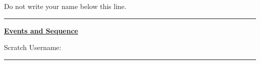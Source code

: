 \documentclass[letterpaper,12pt]{article}
\begin{document}
\noindent Do not write your name below this line. \\
\noindent \hrule
\begin{center}
{\Large \textbf{\underline{Events and Sequence}}}
\end{center}
Scratch Username: \rule{4cm}{0.4pt}

\noindent \dotfill \\
\end{document}
